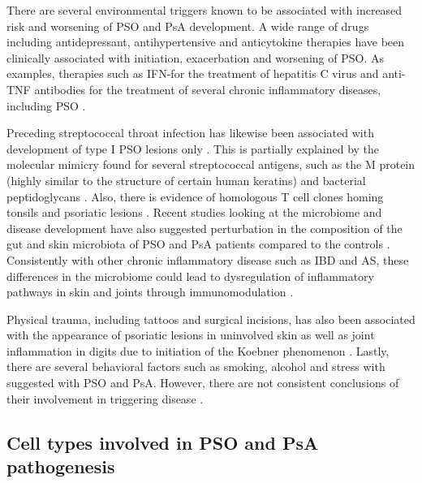 There are several environmental triggers known to be associated with increased risk and worsening of PSO and PsA development. A wide range of drugs including antidepressant, antihypertensive and anticytokine therapies have been clinically associated with initiation, exacerbation and worsening of PSO. As examples, therapies such as IFN-\alpha for the treatment of hepatitis C virus and anti-TNF antibodies for the treatment of several chronic inflammatory diseases, including PSO \parencite{Kim2010}.

Preceding streptococcal throat infection has likewise been associated with development of type I PSO lesions only \parencite{Gudjonsson2003}. This is partially explained by the molecular mimicry found for several streptococcal antigens, such as the M protein (highly similar to the structure of certain human keratins) and bacterial peptidoglycans \parencite{Valdimarsson2009}. Also, there is evidence of homologous T cell clones homing tonsils and psoriatic lesions \parencite{Diluvio2006}. Recent studies looking at the microbiome and disease development have also suggested perturbation in the composition of the gut and skin microbiota of PSO and PsA patients compared to the controls \parencite{Yan2017}. Consistently with other chronic inflammatory disease such as IBD and AS, these differences in the microbiome could lead to dysregulation of inflammatory pathways in skin and joints through immunomodulation \parencite{Eppinga2014}.

Physical trauma, including tattoos and surgical incisions, has also been associated with the appearance of psoriatic lesions in uninvolved skin as well as joint inflammation in digits \parencite {Nestle2009} due to initiation of the Koebner phenomenon \parencite{Weiss2002}. Lastly, there are several behavioral factors such as smoking, alcohol and stress with suggested with PSO and PsA. However, there are not consistent conclusions of their involvement in triggering disease \parencite{Meglio2014}.

\subsection{Cell types involved in PSO and PsA pathogenesis}

